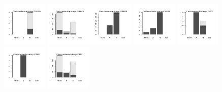 \documentclass[utf8]{frontiersSCNS} %
\begin{document}
\begin{figure}[h!]
\includegraphics[width=0.19\textwidth]{figures/validation_plots/cckar_0p8_valplot.pdf}
\includegraphics[width=0.19\textwidth]{figures/validation_plots/chrm1_0p8_valplot.pdf}
\includegraphics[width=0.19\textwidth]{figures/validation_plots/chrm2_0p8_valplot.pdf}
\includegraphics[width=0.19\textwidth]{figures/validation_plots/chrm3_0p8_valplot.pdf}
\includegraphics[width=0.19\textwidth]{figures/validation_plots/cnr1_0p8_valplot.pdf}
\includegraphics[width=0.19\textwidth]{figures/validation_plots/cnr2_0p8_valplot.pdf}
\includegraphics[width=0.19\textwidth]{figures/validation_plots/drd1_0p8_valplot.pdf}

\end{figure}
\end{document}
